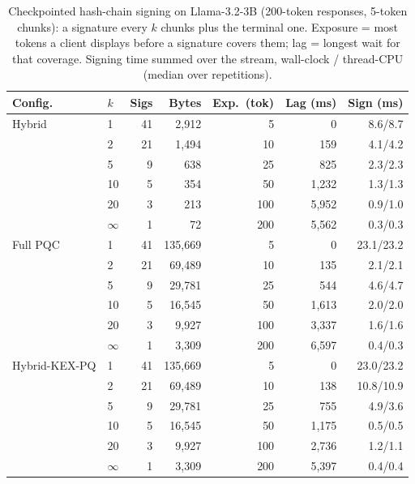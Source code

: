 \begin{table}[t]
\centering
\caption{Checkpointed hash-chain signing on Llama-3.2-3B (200-token responses, 5-token chunks): a signature every $k$ chunks plus the terminal one. Exposure = most tokens a client displays before a signature covers them; lag = longest wait for that coverage. Signing time summed over the stream, wall-clock / thread-CPU (median over repetitions).}
\label{tab:checkpoint}
\setlength{\tabcolsep}{1.8pt}
\footnotesize
\begin{tabular}{@{}llrrrrr@{}}
\toprule
Config. & $k$ & Sigs & Bytes & Exp.\ (tok) & Lag (ms) & Sign (ms) \\
\midrule
Hybrid & 1 & 41 & 2,912 & 5 & 0 & 8.6/8.7 \\
 & 2 & 21 & 1,494 & 10 & 159 & 4.1/4.2 \\
 & 5 & 9 & 638 & 25 & 825 & 2.3/2.3 \\
 & 10 & 5 & 354 & 50 & 1,232 & 1.3/1.3 \\
 & 20 & 3 & 213 & 100 & 5,952 & 0.9/1.0 \\
 & $\infty$ & 1 & 72 & 200 & 5,562 & 0.3/0.3 \\
\addlinespace
Full PQC & 1 & 41 & 135,669 & 5 & 0 & 23.1/23.2 \\
 & 2 & 21 & 69,489 & 10 & 135 & 2.1/2.1 \\
 & 5 & 9 & 29,781 & 25 & 544 & 4.6/4.7 \\
 & 10 & 5 & 16,545 & 50 & 1,613 & 2.0/2.0 \\
 & 20 & 3 & 9,927 & 100 & 3,337 & 1.6/1.6 \\
 & $\infty$ & 1 & 3,309 & 200 & 6,597 & 0.4/0.3 \\
\addlinespace
Hybrid-KEX-PQ & 1 & 41 & 135,669 & 5 & 0 & 23.0/23.2 \\
 & 2 & 21 & 69,489 & 10 & 138 & 10.8/10.9 \\
 & 5 & 9 & 29,781 & 25 & 755 & 4.9/3.6 \\
 & 10 & 5 & 16,545 & 50 & 1,175 & 0.5/0.5 \\
 & 20 & 3 & 9,927 & 100 & 2,736 & 1.2/1.1 \\
 & $\infty$ & 1 & 3,309 & 200 & 5,397 & 0.4/0.4 \\
\bottomrule
\end{tabular}
\end{table}
